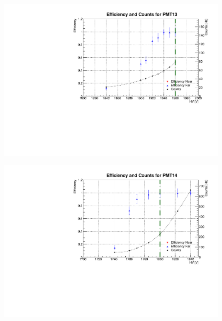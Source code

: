 \begin{figure}[h]
	\centerline{\includegraphics[scale=0.7]{img/eff13.pdf}}
\end{figure}
\begin{figure}[h]
	\centerline{\includegraphics[scale=0.7]{img/eff14.pdf}}
\end{figure}
